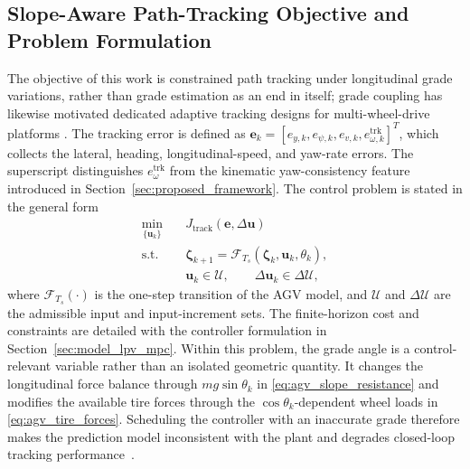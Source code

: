 \documentclass{ieeeaccess}
\newcommand{\citep}[1]{\cite{#1}}
\begin{document}
\subsection{Slope-Aware Path-Tracking Objective and Problem Formulation}

The objective of this work is constrained path tracking under longitudinal
grade variations, rather than grade estimation as an end in itself; grade coupling has likewise motivated dedicated adaptive tracking designs for multi-wheel-drive platforms \citep{Zhang2025CoupledSlope4WID}. The
tracking error is defined as
$\bm e_k=[e_{y,k},e_{\psi,k},e_{v,k},e_{\omega,k}^{\mathrm{trk}}]^{T}$, which
collects the lateral, heading, longitudinal-speed, and yaw-rate errors. The
superscript distinguishes $e_{\omega}^{\mathrm{trk}}$ from the kinematic
yaw-consistency feature introduced in
Section~\ref{sec:proposed_framework}. The control problem is stated in the
general form
\begin{equation}
\begin{aligned}
\min_{\{\bm u_k\}}\quad &J_{\mathrm{track}}(\bm e,\Delta\bm u)\\
\mathrm{s.t.}\quad
&\bm\zeta_{k+1}=\mathcal F_{T_s}(\bm\zeta_k,\bm u_k,\theta_k),\\
&\bm u_k\in\mathcal U,\qquad
\Delta\bm u_k\in\Delta\mathcal U,
\end{aligned}
\label{eq:slope_aware_tracking_objective}
\end{equation}
where $\mathcal F_{T_s}(\cdot)$ is the one-step transition of the AGV model,
and $\mathcal U$ and $\Delta\mathcal U$ are the admissible input and
input-increment sets. The finite-horizon cost and constraints are detailed
with the controller formulation in Section~\ref{sec:model_lpv_mpc}. Within
this problem, the grade angle is a control-relevant variable rather than an
isolated geometric quantity. It changes the longitudinal force balance
through $mg\sin\theta_k$ in \eqref{eq:agv_slope_resistance} and modifies the
available tire forces through the $\cos\theta_k$-dependent wheel loads in
\eqref{eq:agv_tire_forces}. Scheduling the controller with an inaccurate
grade therefore makes the prediction model inconsistent with the plant and
degrades closed-loop tracking
performance~\citep{Sato2013InexactScheduling,Metzler2021PredictionFidelity}.
\end{document}
